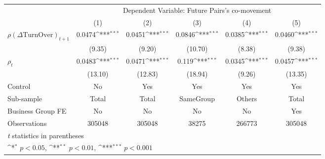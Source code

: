 {
\def\sym#1{\ifmmode^{#1}\else\(^{#1}\)\fi}
\begin{tabular}{l*{5}{c}}
\hline\hline
                    &\multicolumn{5}{c}{Dependent Variable:  Future Pairs's co-movement}                                          \\\cmidrule(lr){2-6}
                    &\multicolumn{1}{c}{(1)}         &\multicolumn{1}{c}{(2)}         &\multicolumn{1}{c}{(3)}         &\multicolumn{1}{c}{(4)}         &\multicolumn{1}{c}{(5)}         \\
\hline
 $ {\rho(\Delta \text{TurnOver})_{t+1}} $ &      0.0474\sym{***}&      0.0451\sym{***}&      0.0846\sym{***}&      0.0385\sym{***}&      0.0460\sym{***}\\
                    &      (9.35)         &      (9.20)         &     (10.70)         &      (8.38)         &      (9.38)         \\
[1em]
 $ {\rho_t} $       &      0.0483\sym{***}&      0.0471\sym{***}&       0.119\sym{***}&      0.0345\sym{***}&      0.0457\sym{***}\\
                    &     (13.10)         &     (12.83)         &     (18.94)         &      (9.26)         &     (13.35)         \\
\hline
Control             &          No         &         Yes         &         Yes         &         Yes         &         Yes         \\
Sub-sample          &       Total         &       Total         &   SameGroup         &      Others         &       Total         \\
Business Group FE   &          No         &          No         &          No         &          No         &         Yes         \\
Observations        &      305048         &      305048         &       38275         &      266773         &      305048         \\
\hline\hline
\multicolumn{6}{l}{\footnotesize \textit{t} statistics in parentheses}\\
\multicolumn{6}{l}{\footnotesize \sym{*} \(p<0.05\), \sym{**} \(p<0.01\), \sym{***} \(p<0.001\)}\\
\end{tabular}
}
